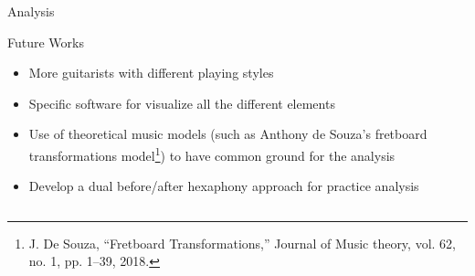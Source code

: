 \documentclass[final]{beamer}
\newlength{\sepwid}
\newlength{\onecolwid}
\begin{document}
\begin{frame}[t]
\begin{columns}[t]
\begin{column}{\onecolwid}
\begin{block}{Analysis}
\end{block}










\begin{alertblock}{Future Works}

\begin{itemize}
    \item More guitarists with different playing styles
    \item Specific software for visualize all the different elements 
    \item Use of theoretical music models (such as Anthony de Souza's fretboard transformations model\footnote{J. De Souza, “Fretboard Transformations,” Journal of
Music theory, vol. 62, no. 1, pp. 1–39, 2018.}) to have common ground for the analysis
    \item Develop a dual before/after hexaphony approach for practice analysis
\end{itemize}

\end{alertblock} 




\begin{column}{\sepwid}\end{column} %


\end{column}
\end{columns}
\end{frame}
\end{document}
